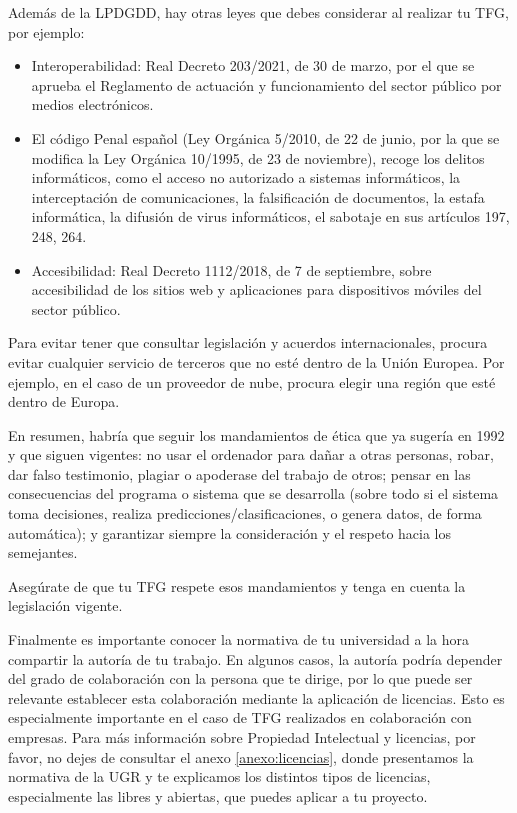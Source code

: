 Además de la LPDGDD, hay otras leyes que debes considerar al realizar tu TFG, por ejemplo:
 
\begin{itemize}
    \item Interoperabilidad: Real Decreto 203/2021, de 30 de marzo, por el que se aprueba el Reglamento de actuación y funcionamiento del sector público por medios electrónicos.
    \item El código Penal español (Ley Orgánica 5/2010, de 22 de junio, por la que se modifica la Ley Orgánica 10/1995, de 23 de noviembre), recoge los delitos informáticos, como el acceso no autorizado a sistemas informáticos, la interceptación de comunicaciones, la falsificación de documentos, la estafa informática, la difusión de virus informáticos, el sabotaje en sus artículos 197, 248, 264.
    \item Accesibilidad: Real Decreto 1112/2018, de 7 de septiembre, sobre accesibilidad de los sitios web y aplicaciones para dispositivos móviles del sector público.
\end{itemize}

Para evitar tener que consultar legislación y acuerdos internacionales, procura evitar cualquier servicio de terceros que no esté dentro de la Unión Europea. Por ejemplo, en el caso de un proveedor de nube, procura elegir una región que esté dentro de Europa.

En resumen, habría que seguir los mandamientos de ética que ya sugería \cite{EticaUCM} en 1992 y que siguen vigentes: no usar el ordenador para dañar a otras personas, robar, dar falso testimonio, plagiar o apoderase del trabajo de otros; pensar en las consecuencias del programa o sistema que se desarrolla (sobre todo si el sistema toma decisiones, realiza predicciones/clasificaciones, o genera datos, de forma automática); y garantizar siempre la consideración y el respeto hacia los semejantes.

Asegúrate de que tu TFG respete esos mandamientos y tenga en cuenta la legislación vigente.

Finalmente es importante conocer la normativa de tu universidad a la hora compartir la autoría de tu trabajo. En algunos casos, la autoría podría depender del grado de colaboración con la persona que te dirige, por lo que puede ser relevante establecer esta colaboración mediante la aplicación de licencias. Esto es especialmente importante en el caso de TFG realizados en colaboración con empresas. Para más información sobre Propiedad Intelectual y licencias, por favor, no dejes de consultar el anexo \ref{anexo:licencias}, donde presentamos la normativa de la UGR y te explicamos los distintos tipos de licencias, especialmente las libres y abiertas, que puedes aplicar a tu proyecto.


